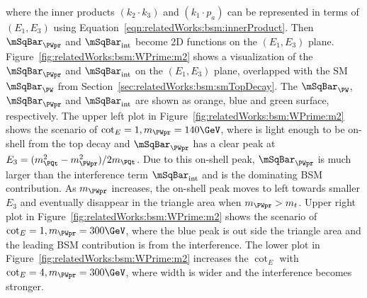 \noindent where the inner products $(  k_2 \cdot k_3)$ and $ (  k_1 \cdot p_a) $ can be represented in terms of $(E_1,E_3)$ using Equation~\ref{eqn:relatedWorks:bsm:innerProduct}. Then $\mSqBar _{\PWpr} $ and $\mSqBar _{\mathrm{int}}$ become 2D functions on the $(E_1,E_3)$ plane.  Figure~\ref{fig:relatedWorks:bsm:WPrime:m2} shows a visualization of the $\mSqBar _{\PWpr} $ and $\mSqBar _{\mathrm{int}}$ on the $(E_1,E_3)$ plane, overlapped with the SM $\mSqBar _{\PW}$ from Section~\ref{sec:relatedWorks:bsm:smTopDecay}. The $\mSqBar _{\PW}$, $\mSqBar _{\PWpr} $ and $\mSqBar _{\mathrm{int}}$ are shown as orange, blue and green surface, respectively. The upper left plot in Figure~\ref{fig:relatedWorks:bsm:WPrime:m2} shows the scenario of $\cot_E=1, m_{\PWpr}=140\GeV$, where \PWpr is light enough to be on-shell from the top decay and  $\mSqBar _{\PWpr} $ has a clear peak at $E_3 = (m^2_\PQt - m^2_{\PWpr})/2 m_\PQt $. Due to this on-shell peak,  $\mSqBar _{\PWpr} $ is much larger than the interference term  $\mSqBar _{\mathrm{int}}$  and is the dominating BSM contribution. As $m_{\PWpr}$ increases, the on-shell \PWpr peak moves to left towards smaller $E_3$ and eventually disappear in the triangle area when $m_{\PWpr} > m_{t}$. Upper right plot in Figure~\ref{fig:relatedWorks:bsm:WPrime:m2} shows the scenario of $\cot_E=1, m_{\PWpr}=300 \GeV$, where the blue peak is out side the triangle area and the leading BSM contribution is from the interference. The lower plot in Figure~\ref{fig:relatedWorks:bsm:WPrime:m2} increases the $\cot_E$  with $\cot_E=4, m_{\PWpr}=300 \GeV$, where \PWpr width is wider and the interference becomes stronger. 





